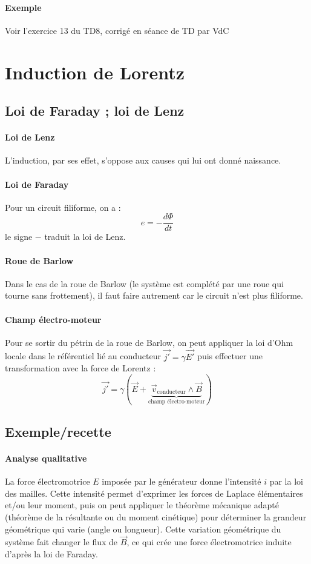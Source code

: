 \documentclass[french]{book}
\theoremstyle{plain}
\theoremstyle{definition}
\theoremstyle{remark}
\begin{document}
\paragraph{Exemple} Voir l'exercice 13 du TD8, corrigé en séance de TD par VdC
\section{Induction de Lorentz}
\subsection{Loi de Faraday ; loi de Lenz}
\paragraph{Loi de Lenz} L'induction, par ses effet, s'oppose aux causes qui lui ont donné naissance.
\paragraph{Loi de Faraday} Pour un circuit filiforme, on a : $$e=-\frac{d\Phi}{dt}$$ le signe $-$ traduit la loi de Lenz.
\paragraph{Roue de Barlow} Dans le cas de la roue de Barlow (le système est complété par une roue qui tourne sans frottement), il faut faire autrement car le circuit n'est plus filiforme. 
\paragraph{Champ électro-moteur} Pour se sortir du pétrin de la roue de Barlow, on peut appliquer la loi d'Ohm locale dans le référentiel lié au conducteur $\overrightarrow{j'}=\gamma\overrightarrow{E'}$ puis effectuer une transformation avec la force de Lorentz : $$\overrightarrow{j'}=\gamma\left(\overrightarrow{E}+\underbrace{\overrightarrow{v}_\text{conducteur}\wedge\overrightarrow{B}}_{\text{champ électro-moteur}}\right)$$
\subsection{Exemple/recette}
\paragraph{Analyse qualitative} La force électromotrice $E$ imposée par le générateur donne l'intensité $i$ par la loi des mailles. Cette intensité permet d'exprimer les forces de Laplace élémentaires et/ou leur moment, puis on peut appliquer le théorème mécanique adapté (théorème de la résultante ou du moment cinétique) pour déterminer la grandeur géométrique qui varie (angle ou longueur). Cette variation géométrique du système fait changer le flux de $\overrightarrow{B}$, ce qui crée une force électromotrice induite d'après la loi de Faraday.
\end{document}
